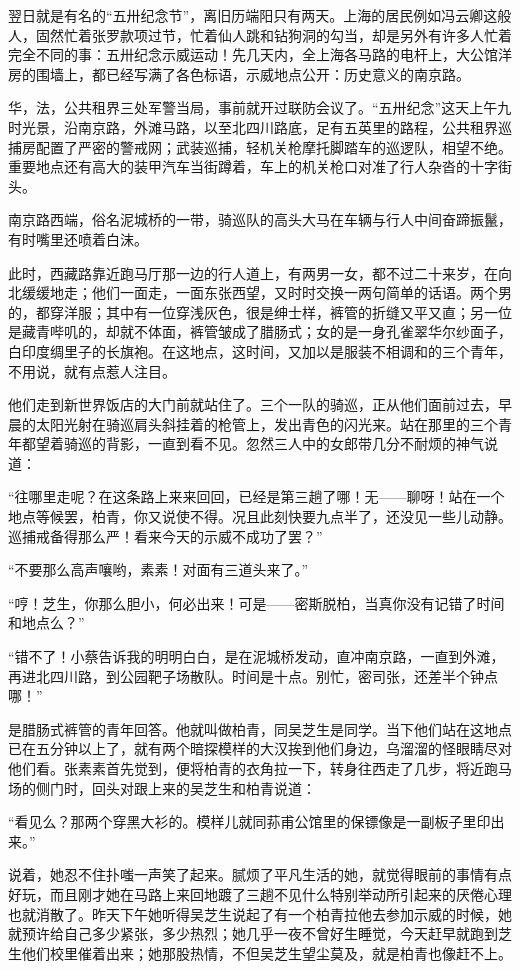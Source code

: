 \par 翌日就是有名的“五卅纪念节”，离旧历端阳只有两天。上海的居民例如冯云卿这般人，固然忙着张罗款项过节，忙着仙人跳和钻狗洞的勾当，却是另外有许多人忙着完全不同的事：五卅纪念示威运动！先几天内，全上海各马路的电杆上，大公馆洋房的围墙上，都已经写满了各色标语，示威地点公开：历史意义的南京路。
\par 华，法，公共租界三处军警当局，事前就开过联防会议了。“五卅纪念”这天上午九时光景，沿南京路，外滩马路，以至北四川路底，足有五英里的路程，公共租界巡捕房配置了严密的警戒网；武装巡捕，轻机关枪摩托脚踏车的巡逻队，相望不绝。重要地点还有高大的装甲汽车当街蹲着，车上的机关枪口对准了行人杂沓的十字街头。
\par 南京路西端，俗名泥城桥的一带，骑巡队的高头大马在车辆与行人中间奋蹄振鬣，有时嘴里还喷着白沫。
\par 此时，西藏路靠近跑马厅那一边的行人道上，有两男一女，都不过二十来岁，在向北缓缓地走；他们一面走，一面东张西望，又时时交换一两句简单的话语。两个男的，都穿洋服；其中有一位穿浅灰色，很是绅士样，裤管的折缝又平又直；另一位是藏青哔叽的，却就不体面，裤管皱成了腊肠式；女的是一身孔雀翠华尔纱面子，白印度绸里子的长旗袍。在这地点，这时间，又加以是服装不相调和的三个青年，不用说，就有点惹人注目。
\par 他们走到新世界饭店的大门前就站住了。三个一队的骑巡，正从他们面前过去，早晨的太阳光射在骑巡肩头斜挂着的枪管上，发出青色的闪光来。站在那里的三个青年都望着骑巡的背影，一直到看不见。忽然三人中的女郎带几分不耐烦的神气说道：
\par “往哪里走呢？在这条路上来来回回，已经是第三趟了哪！无——聊呀！站在一个地点等候罢，柏青，你又说使不得。况且此刻快要九点半了，还没见一些儿动静。巡捕戒备得那么严！看来今天的示威不成功了罢？”
\par “不要那么高声嚷哟，素素！对面有三道头来了。”
\par “哼！芝生，你那么胆小，何必出来！可是——密斯脱柏，当真你没有记错了时间和地点么？”
\par “错不了！小蔡告诉我的明明白白，是在泥城桥发动，直冲南京路，一直到外滩，再进北四川路，到公园靶子场散队。时间是十点。别忙，密司张，还差半个钟点哪！”
\par 是腊肠式裤管的青年回答。他就叫做柏青，同吴芝生是同学。当下他们站在这地点已在五分钟以上了，就有两个暗探模样的大汉挨到他们身边，乌溜溜的怪眼睛尽对他们看。张素素首先觉到，便将柏青的衣角拉一下，转身往西走了几步，将近跑马场的侧门时，回头对跟上来的吴芝生和柏青说道：
\par “看见么？那两个穿黑大衫的。模样儿就同荪甫公馆里的保镖像是一副板子里印出来。”
\par 说着，她忍不住扑嗤一声笑了起来。腻烦了平凡生活的她，就觉得眼前的事情有点好玩，而且刚才她在马路上来回地踱了三趟不见什么特别举动所引起来的厌倦心理也就消散了。昨天下午她听得吴芝生说起了有一个柏青拉他去参加示威的时候，她就预许给自己多少紧张，多少热烈；她几乎一夜不曾好生睡觉，今天赶早就跑到芝生他们校里催着出来；她那股热情，不但吴芝生望尘莫及，就是柏青也像赶不上。
